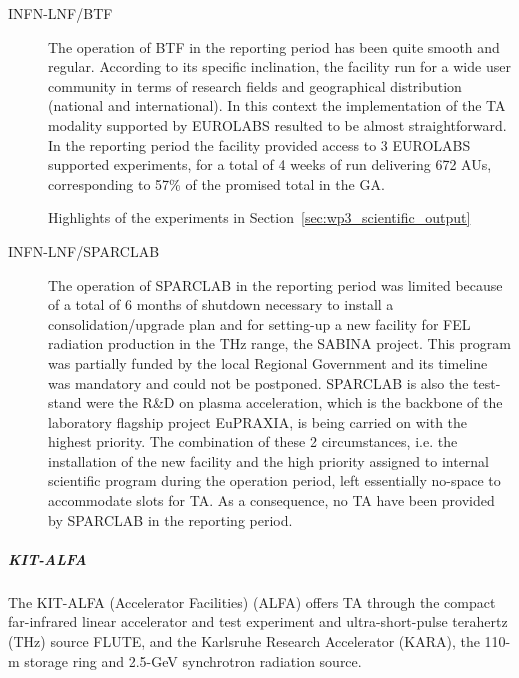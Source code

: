 \begin{description}

\item[INFN-LNF/BTF]
The operation of BTF in the reporting period has been quite smooth and regular. According to its specific inclination, the facility run for a wide user community in terms of research fields and geographical distribution (national and international). In this context the implementation of the TA modality supported by EUROLABS resulted to be almost straightforward. In the reporting period the facility provided access to 3 EUROLABS supported experiments, for a total of 4 weeks of run delivering 672 AUs, corresponding to 57\% of the promised total in the GA. 

Highlights of the experiments in Section~\ref{sec:wp3_scientific_output}

\item[INFN-LNF/SPARCLAB]

The operation of SPARCLAB in the reporting period was limited because of a total of 6 months of shutdown necessary to install a consolidation/upgrade plan and for setting-up a new facility for FEL radiation production in the THz range, the SABINA project. This program was partially funded by the local Regional Government and its timeline was mandatory and could not be postponed. SPARCLAB is also the test-stand were the R\&D on plasma acceleration, which is the backbone of the laboratory flagship project EuPRAXIA, is being carried on with the highest priority. The combination of these 2 circumstances, i.e. the installation of the new facility and the high priority assigned to internal scientific program during the operation period, left essentially no-space to accommodate slots for TA. As a consequence, no TA have been provided by SPARCLAB in the reporting period.
\end{description}


\subparagraph{KIT-ALFA} 
The KIT-ALFA (Accelerator Facilities) (ALFA) offers TA through the compact far-infrared linear accelerator and test experiment and ultra-short-pulse terahertz (THz) source FLUTE, and the Karlsruhe Research Accelerator (KARA), the 110-m storage ring and 2.5-GeV synchrotron radiation source.

